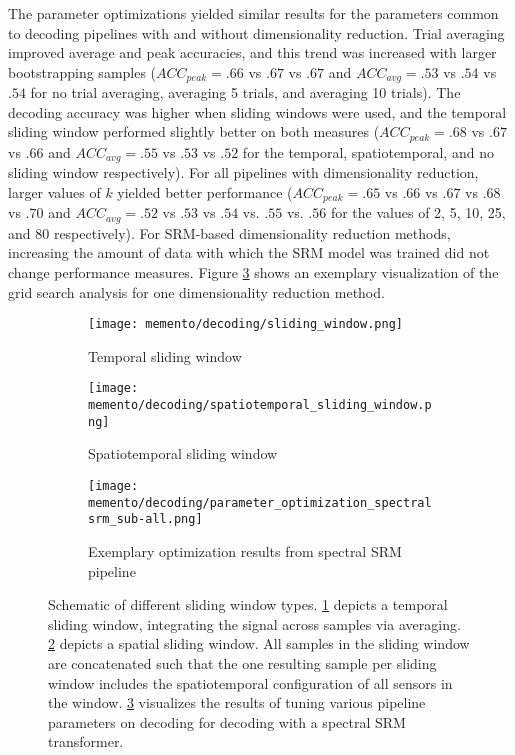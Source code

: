 The parameter optimizations yielded similar results for the parameters common to decoding pipelines with and without dimensionality reduction.
Trial averaging improved average and peak accuracies, and this trend was increased with larger bootstrapping samples ($ACC_{peak} = .66$ vs $.67$ vs $.67$ and $ACC_{avg} = .53$ vs $.54$ vs $.54$ for no trial averaging, averaging 5 trials, and averaging 10 trials).
The decoding accuracy was higher when sliding windows were used, and the temporal sliding window performed slightly better on both measures ($ACC_{peak} = .68$ vs $.67$ vs $.66$ and $ACC_{avg} = .55$ vs $.53$ vs $.52$ for the temporal, spatiotemporal, and no sliding window respectively).
For all pipelines with dimensionality reduction, larger values of $k$ yielded better performance ($ACC_{peak} = .65$ vs $.66$ vs $.67$ vs $.68$ vs $.70$ and $ACC_{avg} = .52$ vs $.53$ vs $.54$ vs. $.55$ vs. $.56$ for the values of 2, 5, 10, 25, and 80 respectively).
For \gls{SRM}-based dimensionality reduction methods, increasing the amount of data with which the \gls{SRM} model was trained did not change performance measures.
Figure \ref{fig:decoding-opti-results} shows an exemplary visualization of the grid search analysis for one dimensionality reduction method.



\begin{figure}
	\centering
	\begin{subfigure}{.65\textwidth}
		\texttt{[image: memento/decoding/sliding\_window.png]}
		\caption{Temporal sliding window}
		\label{fig:temporal-slider}
	\end{subfigure}
	\newline
	\begin{subfigure}{0.39\textwidth}
		\texttt{[image: memento/decoding/spatiotemporal\_sliding\_window.png]}
		\caption{Spatiotemporal sliding window}
		\label{fig:spatiotemporal-slider}
	\end{subfigure}
	\begin{subfigure}{0.59\textwidth}
	\texttt{[image: memento/decoding/parameter\_optimization\_spectralsrm\_sub-all.png]}
	\caption{Exemplary optimization results from spectral SRM pipeline}
	\label{fig:decoding-opti-results}
\end{subfigure}
	\caption[Schematic of different sliding window types and optimization results]{Schematic of different sliding window types. \ref{fig:temporal-slider} depicts a temporal sliding window, integrating the signal across samples via averaging. \ref{fig:spatiotemporal-slider} depicts a spatial sliding window. All samples in the sliding window are concatenated such that the one resulting sample per sliding window includes the spatiotemporal configuration of all sensors in the window.
	\ref{fig:decoding-opti-results} visualizes the results of tuning various pipeline parameters on decoding for decoding with a spectral \gls{SRM} transformer.}
	\label{fig:sliding-windows}
\end{figure}

